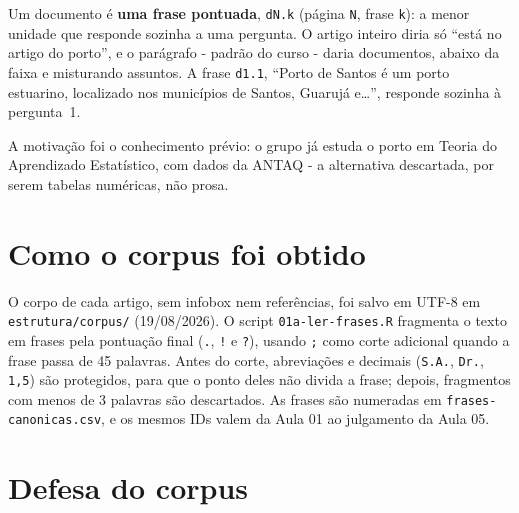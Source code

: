 \documentclass[
  article,
  12pt,
  oneside,
  a4paper,
  english,
  brazil
]{abntex2}\usepackage[]{graphicx}\usepackage[]{xcolor}
\begin{document}
Um documento é \textbf{uma frase pontuada}, \texttt{dN.k} (página \texttt{N},
frase \texttt{k}): a menor unidade que responde sozinha a uma pergunta. O
artigo inteiro diria só ``está no artigo do porto'', e o parágrafo - padrão do
curso - daria  documentos, abaixo da faixa e
misturando assuntos. A frase \texttt{d1.1}, ``Porto de Santos é um porto estuarino, localizado nos municípios de Santos, Guarujá e\ldots'', responde
sozinha à pergunta~1.

A motivação foi o conhecimento prévio: o grupo já estuda o porto em Teoria do
Aprendizado Estatístico, com dados da ANTAQ - a alternativa descartada, por
serem tabelas numéricas, não prosa.

\section{Como o corpus foi obtido}

O corpo de cada artigo, sem infobox nem referências, foi salvo em UTF-8 em
\texttt{estrutura/corpus/} (19/08/2026). O script \texttt{01a-ler-frases.R}
fragmenta o texto em frases pela pontuação final (\texttt{.}, \texttt{!} e
\texttt{?}), usando \texttt{;} como corte adicional quando a frase passa de 45
palavras. Antes do corte, abreviações e decimais (\texttt{S.A.}, \texttt{Dr.},
\texttt{1,5}) são protegidos, para que o ponto deles não divida a frase; depois,
fragmentos com menos de 3 palavras são descartados. As frases são numeradas em
\texttt{frases-canonicas.csv}, e os mesmos IDs valem da Aula 01 ao julgamento
da Aula 05.

\section{Defesa do corpus}
\end{document}
